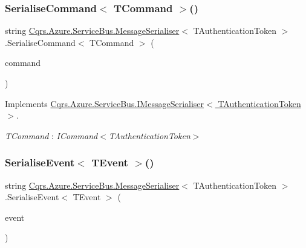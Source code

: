\subsubsection{\texorpdfstring{Serialise\+Command$<$ T\+Command $>$()}{SerialiseCommand< TCommand >()}}
{\footnotesize\ttfamily string \hyperlink{classCqrs_1_1Azure_1_1ServiceBus_1_1MessageSerialiser}{Cqrs.\+Azure.\+Service\+Bus.\+Message\+Serialiser}$<$ T\+Authentication\+Token $>$.Serialise\+Command$<$ T\+Command $>$ (\begin{DoxyParamCaption}\item[{T\+Command}]{command }\end{DoxyParamCaption})}



Implements \hyperlink{interfaceCqrs_1_1Azure_1_1ServiceBus_1_1IMessageSerialiser_a7454ac36eca3dd37d0c596e0406b4c81}{Cqrs.\+Azure.\+Service\+Bus.\+I\+Message\+Serialiser$<$ T\+Authentication\+Token $>$}.

\begin{Desc}
\item[Type Constraints]\begin{description}
\item[{\em T\+Command} : {\em I\+Command$<$T\+Authentication\+Token$>$}]\end{description}
\end{Desc}
\mbox{\label{classCqrs_1_1Azure_1_1ServiceBus_1_1MessageSerialiser_a596224ec927c673958e72a2153931c09}} 
\subsubsection{\texorpdfstring{Serialise\+Event$<$ T\+Event $>$()}{SerialiseEvent< TEvent >()}}
{\footnotesize\ttfamily string \hyperlink{classCqrs_1_1Azure_1_1ServiceBus_1_1MessageSerialiser}{Cqrs.\+Azure.\+Service\+Bus.\+Message\+Serialiser}$<$ T\+Authentication\+Token $>$.Serialise\+Event$<$ T\+Event $>$ (\begin{DoxyParamCaption}\item[{T\+Event @}]{event }\end{DoxyParamCaption})}



